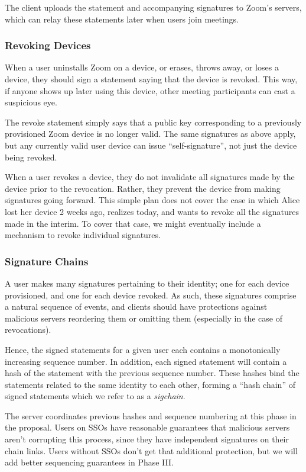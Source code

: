 The client uploads the statement and accompanying signatures to Zoom's servers, which can relay these statements later when users join meetings.

\subsubsection{Revoking Devices}

When a user uninstalls Zoom on a device, or erases, throws away, or loses a device, they should sign a statement saying that the device is revoked. This way, if anyone shows up later using this device, other meeting participants can cast a suspicious eye.

The revoke statement simply says that a public key corresponding to a previously provisioned Zoom device is no longer valid. The same signatures as above apply, but any currently valid user device can issue ``self-signature'', not just the device being revoked.

When a user revokes a device, they do not invalidate all signatures made by the device prior to the revocation. Rather, they prevent the device from making signatures going forward. This simple plan does not cover the case in which Alice lost her device 2 weeks ago, realizes today, and wants to revoke all the signatures made in the interim. To cover that case, we might eventually include a mechanism to revoke individual signatures.

\subsubsection{Signature Chains}

A user makes many signatures pertaining to their identity; one for each device provisioned, and one for each device revoked. As such, these signatures comprise a natural sequence of events, and clients should have protections against malicious servers reordering them or omitting them (especially in the case of revocations).

Hence, the signed statements for a given user each contains a monotonically increasing sequence number. In addition, each signed statement will contain a hash of the statement with the previous sequence number. These hashes bind the statements related to the same identity to each other, forming a ``hash chain'' of signed statements which we refer to as a \textit{sigchain}.

The server coordinates previous hashes and sequence numbering at this phase in the proposal. Users on SSOs have reasonable guarantees that malicious servers aren't corrupting this process, since they have independent signatures on their chain links. Users without SSOs don't get that additional protection, but we will add better sequencing guarantees in Phase III.


